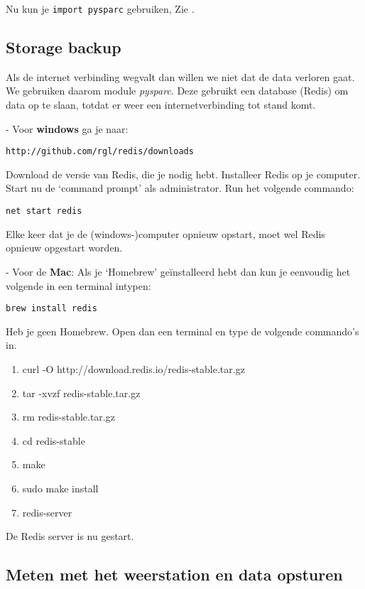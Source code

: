 Nu kun je \verb|import pysparc| gebruiken, Zie  .


\subsection{Storage backup}

Als de internet verbinding wegvalt dan willen we niet dat de data verloren gaat.
We gebruiken daarom module \emph{pysparc}. Deze gebruikt een database (Redis) om data
op te slaan, totdat er weer een internetverbinding tot stand komt. 

- Voor \textbf{windows} ga je naar:
\begin{verbatim}
http://github.com/rgl/redis/downloads
\end{verbatim}

Download de versie van Redis, die je nodig hebt.
Installeer Redis op je computer. Start nu de `command prompt' als administrator.
Run het volgende commando: 

\begin{verbatim}
net start redis
\end{verbatim}

Elke keer dat je de (windows-)computer opnieuw opstart, moet wel Redis opnieuw opgestart worden.

- Voor de \textbf{Mac}:
Als je `Homebrew' geïnstalleerd hebt dan kun je eenvoudig het volgende 
in een terminal intypen: 
\begin{verbatim}
brew install redis
\end{verbatim}

Heb je geen Homebrew. Open dan een terminal en type de volgende commando's in. 

\begin{enumerate}
    \item curl -O http://download.redis.io/redis-stable.tar.gz
    \item tar -xvzf redis-stable.tar.gz 
    \item rm redis-stable.tar.gz 
    \item cd redis-stable 
    \item make 
    \item sudo make install
    \item redis-server
 \end{enumerate}
 
De Redis server is nu gestart. 


\subsection{Meten met het weerstation en data opsturen}

